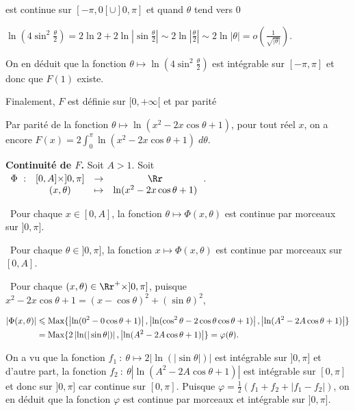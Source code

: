 {\begin{enumerate}
{est continue sur $[-\pi,0[\cup]0,\pi]$ et quand $\theta$ tend vers $0$

\begin{center}
$\ln\left(4\sin^2\frac{\theta}{2}\right)=2\ln2+2\ln\left|\sin\frac{\theta}{2}\right|\sim2\ln\left|\frac{\theta}{2}\right|\sim2\ln|\theta|=o\left(\frac{1}{\sqrt{|\theta|}}\right)$.
\end{center}

On en déduit que la fonction $\theta\mapsto\ln\left(4\sin^2\frac{\theta}{2}\right)$ est intégrable sur $[-\pi,\pi]$ et donc que $F(1)$ existe.

Finalement, $F$ est définie sur $[0,+\infty[$ et par parité

\begin{center}
\end{center}

 Par parité de la fonction $\theta\mapsto\ln(x^2-2x\cos\theta+1)$, pour tout réel $x$, on a encore $F(x)=2\int_{0}^{\pi}\ln(x^2-2x\cos\theta+1)\;d\theta$.

\textbf{Continuité de $F$.} Soit $A>1$. Soit $\begin{array}[t]{cccc}
\Phi~:&[0,A]\times]0,\pi]&\rightarrow&\Rr\\
 &(x,\theta)&\mapsto&\ln(x^2-2x\cos\theta+1)
\end{array}$.

\textbullet~Pour chaque $x\in[0,A]$, la fonction $\theta\mapsto\Phi(x,\theta)$ est continue par morceaux sur $]0,\pi]$.

\textbullet~Pour chaque $\theta\in]0,\pi]$, la fonction $x\mapsto\Phi(x,\theta)$ est continue par morceaux sur $[0,A]$.

\textbullet~Pour chaque $(x,\theta)\in\Rr^+\times]0,\pi]$, puisque $x^2-2x\cos\theta+1=(x-\cos\theta)^2+(\sin\theta)^2$,

\begin{align*}\ensuremath
|\Phi(x,\theta)|&\leqslant\text{Max}\{\left|\ln(0^2-0\cos\theta+1)\right|,\left|\ln(\cos^2\theta-2\cos\theta\cos\theta+1)\right|,\left|\ln(A^2-2A\cos\theta+1)\right|\}\\
 &=\text{Max}\{2\left|\ln(|\sin\theta|)\right|,\left|\ln(A^2-2A\cos\theta+1)\right|\}=\varphi(\theta).
\end{align*}

On a vu que la fonction $f_1~:~\theta\mapsto2\left|\ln(|\sin\theta|)\right|$ est intégrable sur $]0,\pi]$ et d'autre part, la fonction $f_2~:~\theta\left|\ln(A^2-2A\cos\theta+1)\right|$ est intégrable sur $[0,\pi]$ et donc sur $]0,\pi]$ car continue sur $[0,\pi]$. Puisque $\varphi=\frac{1}{2}(f_1+f_2+|f_1-f_2|)$, on en déduit que la fonction $\varphi$ est continue par morceaux et intégrable sur $]0,\pi]$.

}
\end{enumerate}}
